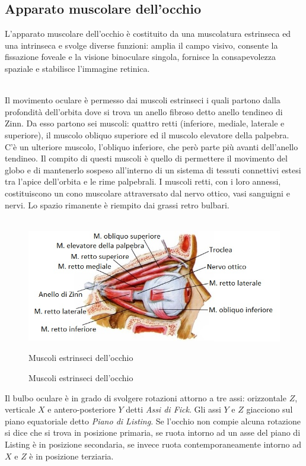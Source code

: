 \subsection{Apparato muscolare dell'occhio}

L’apparato muscolare dell'occhio è costituito da una muscolatura estrinseca ed una intrinseca e svolge diverse funzioni: amplia il campo visivo, consente la fissazione foveale e la visione binoculare singola, fornisce la consapevolezza spaziale e stabilisce l'immagine retinica.
\\\
 
Il movimento oculare è permesso dai muscoli estrinseci i quali partono dalla profondità dell’orbita dove si trova un anello fibroso detto anello tendineo di Zinn. Da esso partono sei muscoli: quattro retti (inferiore, mediale, laterale e superiore), il muscolo obliquo superiore ed il muscolo elevatore della palpebra. C’è un ulteriore muscolo, l’obliquo inferiore, che però parte più avanti dell’anello tendineo. Il compito di questi muscoli è quello di permettere il movimento del globo e di mantenerlo sospeso all’interno di un sistema di tessuti connettivi estesi tra l’apice dell’orbita e le rime palpebrali. I muscoli retti, con i loro annessi, costituiscono un cono muscolare attraversato dal nervo ottico, vasi sanguigni e nervi. Lo spazio rimanente è riempito dai grassi retro bulbari. 
\\\
\begin{figure}[h!]
	\centering
	\includegraphics[scale=2.7]{source/immagini/muscoli_estrinseci_occhio.jpg}
	\caption{Muscoli estrinseci dell'occhio}{Muscoli estrinseci dell'occhio}
	\label{fig:test6}
\end{figure}

Il bulbo oculare è in grado di svolgere rotazioni attorno a tre assi: orizzontale $Z$, verticale $X$ e antero-posteriore $Y$ detti \emph{Assi di Fick}. Gli assi $Y$ e $Z$ giacciono sul piano equatoriale detto \emph{Piano di Listing}. Se l’occhio non compie alcuna rotazione si dice che si trova in posizione primaria, se ruota intorno ad un asse del piano di Listing  è in posizione secondaria, se invece ruota contemporaneamente intorno ad $X$ e $Z$ è in posizione terziaria.

